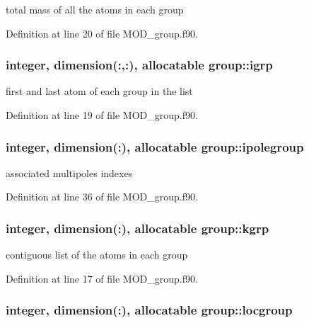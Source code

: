 total mass of all the atoms in each group 



Definition at line 20 of file M\-O\-D\-\_\-group.\-f90.

\hypertarget{classgroup_ac4dd0d4e5c4885c1cb77e954925ef324}{
\subsubsection[{igrp}]{\setlength{\rightskip}{0pt plus 5cm}integer, dimension(\-:,\-:), allocatable group\-::igrp}}\label{classgroup_ac4dd0d4e5c4885c1cb77e954925ef324}


first and last atom of each group in the list 



Definition at line 19 of file M\-O\-D\-\_\-group.\-f90.

\hypertarget{classgroup_af86e4e989b87c7c2419c57f6d2b776a0}{
\subsubsection[{ipolegroup}]{\setlength{\rightskip}{0pt plus 5cm}integer, dimension(\-:), allocatable group\-::ipolegroup}}\label{classgroup_af86e4e989b87c7c2419c57f6d2b776a0}


associated multipoles indexes 



Definition at line 36 of file M\-O\-D\-\_\-group.\-f90.

\hypertarget{classgroup_a4234ee36c99f383d0a54c4a2718bc659}{
\subsubsection[{kgrp}]{\setlength{\rightskip}{0pt plus 5cm}integer, dimension(\-:), allocatable group\-::kgrp}}\label{classgroup_a4234ee36c99f383d0a54c4a2718bc659}


contiguous list of the atoms in each group 



Definition at line 17 of file M\-O\-D\-\_\-group.\-f90.

\hypertarget{classgroup_af5c355551ec947f259a2e56f5be89279}{
\subsubsection[{locgroup}]{\setlength{\rightskip}{0pt plus 5cm}integer, dimension(\-:), allocatable group\-::locgroup}}\label{classgroup_af5c355551ec947f259a2e56f5be89279}


